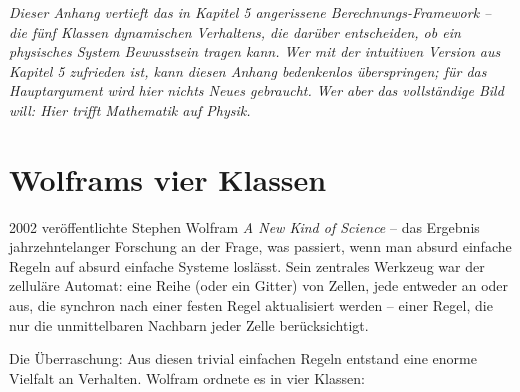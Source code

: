 \documentclass[11pt, twoside, openright]{book}
\begin{document}
\textit{Dieser Anhang vertieft das in Kapitel 5 angerissene Berechnungs-Framework -- die fünf Klassen dynamischen Verhaltens, die darüber entscheiden, ob ein physisches System Bewusstsein tragen kann. Wer mit der intuitiven Version aus Kapitel 5 zufrieden ist, kann diesen Anhang bedenkenlos überspringen; für das Hauptargument wird hier nichts Neues gebraucht. Wer aber das vollständige Bild will: Hier trifft Mathematik auf Physik.}

\section*{Wolframs vier Klassen}

2002 veröffentlichte Stephen Wolfram \textit{A New Kind of Science} -- das Ergebnis jahrzehntelanger Forschung an der Frage, was passiert, wenn man absurd einfache Regeln auf absurd einfache Systeme loslässt. Sein zentrales Werkzeug war der zelluläre Automat: eine Reihe (oder ein Gitter) von Zellen, jede entweder an oder aus, die synchron nach einer festen Regel aktualisiert werden -- einer Regel, die nur die unmittelbaren Nachbarn jeder Zelle berücksichtigt.

Die Überraschung: Aus diesen trivial einfachen Regeln entstand eine enorme Vielfalt an Verhalten. Wolfram ordnete es in vier Klassen:


\clearpage
\thispagestyle{plain}
\vspace*{\fill}
\begin{center}
\end{center}
\vspace*{\fill}
\clearpage
\end{document}
